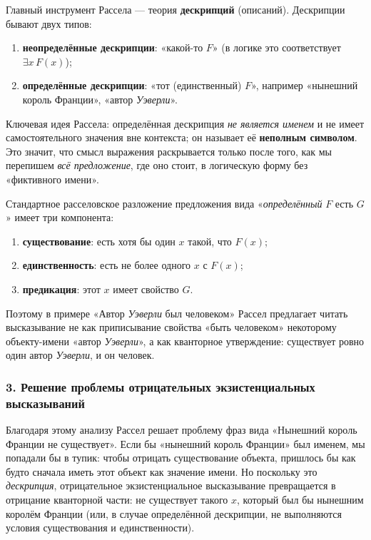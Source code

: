 \documentclass[a4paper,12pt]{article}
\begin{document}
Главный инструмент Рассела --- теория \textbf{дескрипций} (описаний). Дескрипции бывают двух типов:
\begin{enumerate}
    \item \textbf{неопределённые дескрипции}: «какой-то $F$» (в логике это соответствует $\exists x\,F(x)$);
    \item \textbf{определённые дескрипции}: «тот (единственный) $F$», например «нынешний король Франции», «автор \emph{Уэверли}».
\end{enumerate}

Ключевая идея Рассела: определённая дескрипция \emph{не является именем} и не имеет самостоятельного значения вне контекста; он называет её \textbf{неполным символом}. Это значит, что смысл выражения раскрывается только после того, как мы перепишем \emph{всё предложение}, где оно стоит, в логическую форму без «фиктивного имени».

Стандартное расселовское разложение предложения вида «\emph{определённый} $F$ есть $G$» имеет три компонента:
\begin{enumerate}
    \item \textbf{существование}: есть хотя бы один $x$ такой, что $F(x)$;
    \item \textbf{единственность}: есть не более одного $x$ с $F(x)$;
    \item \textbf{предикация}: этот $x$ имеет свойство $G$.
\end{enumerate}
Поэтому в примере «Автор \emph{Уэверли} был человеком» Рассел предлагает читать высказывание не как приписывание свойства «быть человеком» некоторому объекту-имени «автор \emph{Уэверли}», а как кванторное утверждение: существует ровно один автор \emph{Уэверли}, и он человек.

\subsubsection*{3. Решение проблемы отрицательных экзистенциальных высказываний}

Благодаря этому анализу Рассел решает проблему фраз вида «Нынешний король Франции не существует». Если бы «нынешний король Франции» был именем, мы попадали бы в тупик: чтобы отрицать существование объекта, пришлось бы как будто сначала иметь этот объект как значение имени. Но поскольку это \emph{дескрипция}, отрицательное экзистенциальное высказывание превращается в отрицание кванторной части: не существует такого $x$, который был бы нынешним королём Франции (или, в случае определённой дескрипции, не выполняются условия существования и единственности).
\end{document}
